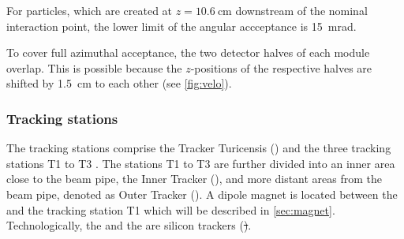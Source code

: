 For particles, which are created at $z=\SI{10.6}{\centi\metre}$ downstream of the nominal interaction point, the lower limit of the angular accceptance is \SI{15}{\milli\radian}.

To cover full azimuthal acceptance, the two detector halves of each module overlap.
This is possible because the $z$-positions of the respective halves are shifted by \SI{1.5}{\centi\metre} to each other (see \cref{fig:velo}).

\subsubsection*{Tracking stations}
\label{sec:trackingStations}

The tracking stations comprise the Tracker Turicensis (\ttracker) and the three tracking stations T1 to T3 .
The stations T1 to T3 are further divided into an inner area close to the beam pipe, the Inner Tracker (\intr), and more distant areas from the beam pipe, denoted as Outer Tracker (\ot).
A dipole magnet is located between the \ttracker and the tracking station T1 which will be described in \cref{sec:magnet}.
Technologically, the \ttracker and the \intr are silicon trackers (\st).

